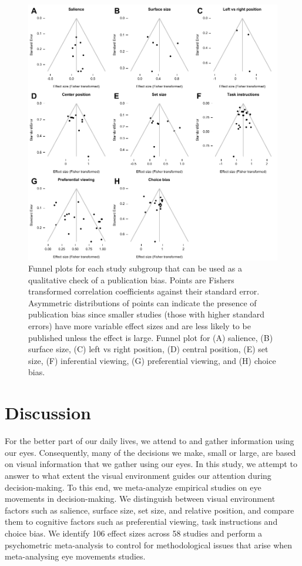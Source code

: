 \documentclass[english,natbib,man,floatsintext]{apa6}
\begin{document}
\begin{figure}%
\includegraphics{funnel_plots}
\centering
\caption{Funnel plots for each study subgroup that can be used as a qualitative check of a publication bias. Points are Fishers transformed correlation coefficients against their standard error. Asymmetric distributions of points can indicate the presence of publication bias since smaller studies (those with higher standard errors) have more variable effect sizes and are less likely to be published unless the effect is large. Funnel plot for (A) salience, (B) surface size, (C) left vs right position, (D) central position, (E) set size, (F) inferential viewing, (G) preferential viewing, and (H) choice bias.}
\label{fig:funnel_plots}
\end{figure}




\section{Discussion}

For the better part of our daily lives, we attend to and gather information using our eyes. Consequently, many of the decisions we make, small or large, are based on visual information that we gather using our eyes. In this study, we attempt to answer to what extent the visual environment guides our attention during decision-making. To this end, we meta-analyze empirical studies on eye movements in decision-making. We distinguish between visual environment factors such as salience, surface size, set size, and relative position, and compare them to cognitive factors such as preferential viewing, task instructions and choice bias. We identify 106 effect sizes across 58 studies and perform a psychometric meta-analysis to control for methodological issues that arise when meta-analysing eye movements studies. 
\end{document}
